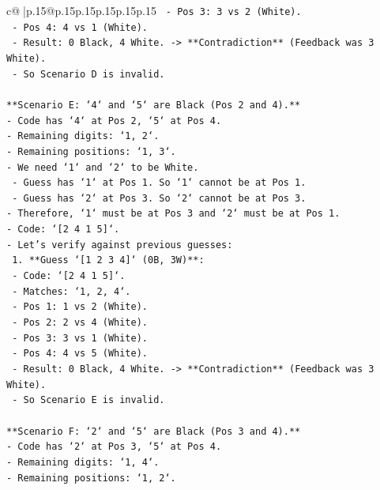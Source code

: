 \documentclass{article}
\begin{document}
{\begin{supertabular}{c@{$\;$}|p{.15\linewidth}@{}p{.15\linewidth}p{.15\linewidth}p{.15\linewidth}p{.15\linewidth}p{.15\linewidth}}
{{{\texttt{        {-} Pos 3: 3 vs 2 (White).} \\
\texttt{        {-} Pos 4: 4 vs 1 (White).} \\
\texttt{        {-} Result: 0 Black, 4 White. {-}> **Contradiction** (Feedback was 3 White).} \\
\texttt{    {-} So Scenario D is invalid.} \\
\\ 
\texttt{**Scenario E: `4` and `5` are Black (Pos 2 and 4).**} \\
\texttt{{-} Code has `4` at Pos 2, `5` at Pos 4.} \\
\texttt{{-} Remaining digits: `1, 2`.} \\
\texttt{{-} Remaining positions: `1, 3`.} \\
\texttt{{-} We need `1` and `2` to be White.} \\
\texttt{    {-} Guess has `1` at Pos 1. So `1` cannot be at Pos 1.} \\
\texttt{    {-} Guess has `2` at Pos 3. So `2` cannot be at Pos 3.} \\
\texttt{{-} Therefore, `1` must be at Pos 3 and `2` must be at Pos 1.} \\
\texttt{{-} Code: `{[}2 4 1 5{]}`.} \\
\texttt{{-} Let's verify against previous guesses:} \\
\texttt{    1.  **Guess `{[}1 2 3 4{]}` (0B, 3W)**:} \\
\texttt{        {-} Code: `{[}2 4 1 5{]}`.} \\
\texttt{        {-} Matches: `1, 2, 4`.} \\
\texttt{        {-} Pos 1: 1 vs 2 (White).} \\
\texttt{        {-} Pos 2: 2 vs 4 (White).} \\
\texttt{        {-} Pos 3: 3 vs 1 (White).} \\
\texttt{        {-} Pos 4: 4 vs 5 (White).} \\
\texttt{        {-} Result: 0 Black, 4 White. {-}> **Contradiction** (Feedback was 3 White).} \\
\texttt{    {-} So Scenario E is invalid.} \\
\\ 
\texttt{**Scenario F: `2` and `5` are Black (Pos 3 and 4).**} \\
\texttt{{-} Code has `2` at Pos 3, `5` at Pos 4.} \\
\texttt{{-} Remaining digits: `1, 4`.} \\
\texttt{{-} Remaining positions: `1, 2`.} \\
}}}
\end{supertabular}}
\end{document}
